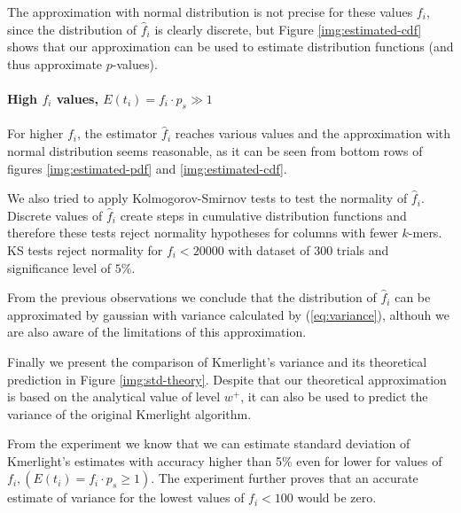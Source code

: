 The approximation with normal distribution is not precise for these values $f_i$, since
the distribution of $\hat f_i$ is clearly discrete, but Figure \ref{img:estimated-cdf} shows
that our approximation can be used to estimate distribution functions (and thus approximate
$p$-values).

\paragraph{High $f_i$ values, $E(t_i) = f_i \cdot p_s \gg 1$}
For higher $f_i$, the estimator $\hat f_i$ reaches various values and the approximation with
normal distribution seems reasonable, as it can be seen from bottom rows of figures 
\ref{img:estimated-pdf} and \ref{img:estimated-cdf}.

\medskip

We also tried to apply Kolmogorov-Smirnov tests to test the normality of $\hat f_i$. Discrete
values of $\hat f_i$ create steps in cumulative distribution functions and therefore these
tests reject normality hypotheses for columns with fewer $k$-mers. KS tests reject normality
for $f_i < 20000$ with dataset of 300 trials and significance level of $5\%$. 

\medskip

From the previous observations we conclude that the distribution of $\hat f_i$ can be approximated
by gaussian with variance calculated by (\ref{eq:variance}), althouh we are also aware of the
limitations of this approximation.

Finally we present the comparison of Kmerlight's variance and its theoretical prediction in
Figure \ref{img:std-theory}. Despite that our theoretical approximation is based on the 
analytical value of level $w^+$, it can also be used to predict the variance of the original 
Kmerlight algorithm. 

From the experiment we know that we can estimate standard deviation of Kmerlight's estimates
with accuracy higher than 5\% even for lower for values of $f_i,
(E(t_i) = f_i \cdot p_s \geq 1)$. The experiment further proves that an accurate estimate of
variance for the lowest values of $f_i < 100$ would be zero. 

